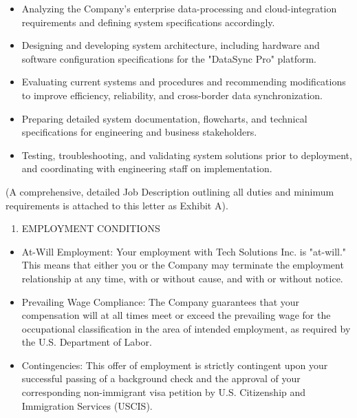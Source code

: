 \begin{itemize}

\item Analyzing the Company's enterprise data-processing and cloud-integration requirements and defining system specifications accordingly.

\item Designing and developing system architecture, including hardware and software configuration specifications for the "DataSync Pro" platform.

\item Evaluating current systems and procedures and recommending modifications to improve efficiency, reliability, and cross-border data synchronization.

\item Preparing detailed system documentation, flowcharts, and technical specifications for engineering and business stakeholders.

\item Testing, troubleshooting, and validating system solutions prior to deployment, and coordinating with engineering staff on implementation.

\end{itemize}

(A comprehensive, detailed Job Description outlining all duties and minimum requirements is attached to this letter as Exhibit A).

\begin{enumerate}

\item EMPLOYMENT CONDITIONS

\end{enumerate}

\begin{itemize}

\item At-Will Employment: Your employment with Tech Solutions Inc. is "at-will." This means that either you or the Company may terminate the employment relationship at any time, with or without cause, and with or without notice.

\item Prevailing Wage Compliance: The Company guarantees that your compensation will at all times meet or exceed the prevailing wage for the occupational classification in the area of intended employment, as required by the U.S. Department of Labor.

\item Contingencies: This offer of employment is strictly contingent upon your successful passing of a background check and the approval of your corresponding non-immigrant visa petition by U.S. Citizenship and Immigration Services (USCIS).

\end{itemize}

